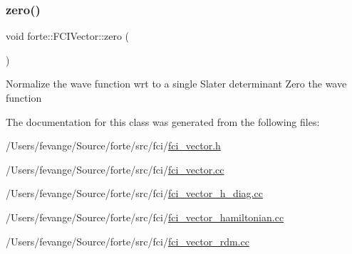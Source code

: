 \mbox{\label{classforte_1_1_f_c_i_vector_abc76153c77025417cebb1a58d5382ae1}} 
\subsubsection{\texorpdfstring{zero()}{zero()}}
{\footnotesize\ttfamily void forte\+::\+F\+C\+I\+Vector\+::zero (\begin{DoxyParamCaption}{ }\end{DoxyParamCaption})}

Normalize the wave function wrt to a single Slater determinant Zero the wave function 

The documentation for this class was generated from the following files\+:\begin{DoxyCompactItemize}
\item 
/\+Users/fevange/\+Source/forte/src/fci/\mbox{\hyperlink{fci__vector_8h}{fci\+\_\+vector.\+h}}\item 
/\+Users/fevange/\+Source/forte/src/fci/\mbox{\hyperlink{fci__vector_8cc}{fci\+\_\+vector.\+cc}}\item 
/\+Users/fevange/\+Source/forte/src/fci/\mbox{\hyperlink{fci__vector__h__diag_8cc}{fci\+\_\+vector\+\_\+h\+\_\+diag.\+cc}}\item 
/\+Users/fevange/\+Source/forte/src/fci/\mbox{\hyperlink{fci__vector__hamiltonian_8cc}{fci\+\_\+vector\+\_\+hamiltonian.\+cc}}\item 
/\+Users/fevange/\+Source/forte/src/fci/\mbox{\hyperlink{fci__vector__rdm_8cc}{fci\+\_\+vector\+\_\+rdm.\+cc}}\end{DoxyCompactItemize}
